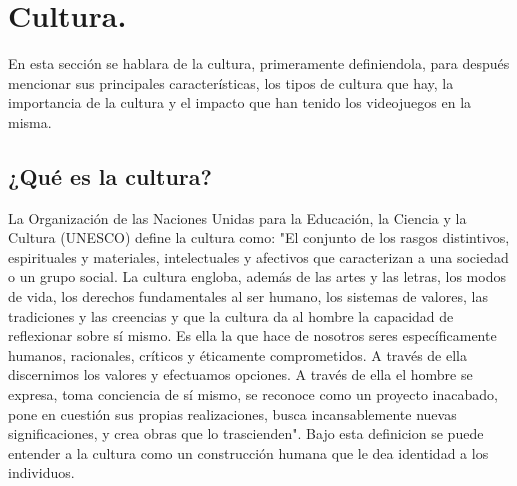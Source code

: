 \section{Cultura.}\label{cultura}
	En esta sección se hablara de la cultura, primeramente definiendola, para después mencionar sus principales características, los tipos de cultura que hay, la importancia de la cultura y el impacto que han tenido los videojuegos en la misma.
	\subsection{¿Qué es la cultura?}\label{CulturaDef}
	La Organización de las Naciones Unidas para la Educación, la Ciencia y la Cultura (UNESCO) define la cultura como: "El conjunto de los rasgos distintivos, espirituales y materiales, intelectuales y afectivos que caracterizan a una sociedad o un grupo social. La cultura engloba, además de las artes y las letras, los modos de vida, los derechos fundamentales al ser humano, los sistemas de valores, las tradiciones y las creencias y que la cultura da al hombre la capacidad de reflexionar sobre sí mismo. Es ella la que hace de nosotros seres específicamente humanos, racionales, críticos y éticamente comprometidos. A través de ella discernimos los valores y efectuamos opciones. A través de ella el hombre se expresa, toma conciencia de sí mismo, se reconoce como un proyecto inacabado, pone en cuestión sus propias realizaciones, busca incansablemente nuevas significaciones, y crea obras que lo trascienden"\cite{RefCultura}. Bajo esta definicion se puede entender a la cultura como un construcción humana que le dea identidad a los individuos. 
	
